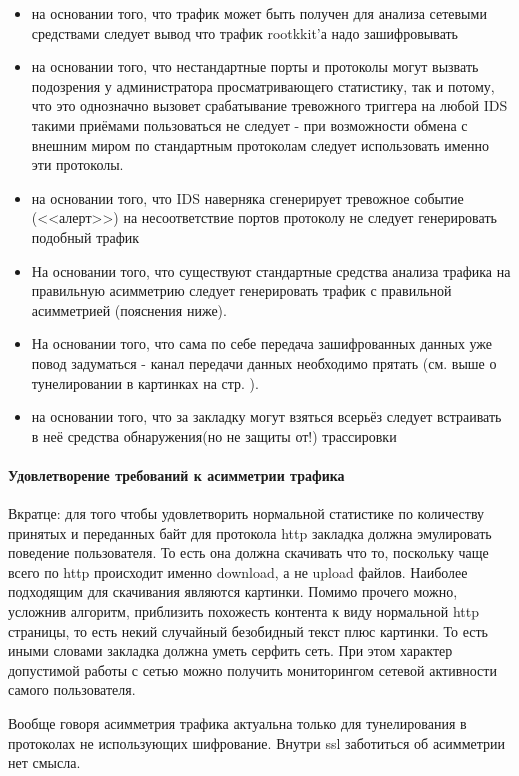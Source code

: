 \begin{itemize}
\item{на основании того, что трафик может быть получен для анализа сетевыми средствами следует вывод что трафик rootkkit'а надо зашифровывать}
\item{на основании того, что нестандартные порты и протоколы могут вызвать подозрения у администратора просматривающего статистику, так и потому, что это однозначно вызовет срабатывание тревожного триггера на любой IDS такими приёмами пользоваться не следует - при возможности обмена с внешним миром по стандартным протоколам следует использовать именно эти протоколы.}
\item{на основании того, что IDS наверняка сгенерирует тревожное событие (<<алерт>>) на несоответствие портов протоколу не следует генерировать подобный трафик}
\item{На основании того, что существуют стандартные средства анализа трафика на правильную асимметрию следует генерировать трафик с правильной асимметрией (пояснения ниже).}
\item{На основании того, что сама по себе передача зашифрованных данных уже повод задуматься - канал передачи данных необходимо прятать (см. выше о тунелировании в картинках на  стр. \pageref{hidden_tunnel}).}
\item{на основании того, что за закладку могут взяться всерьёз следует встраивать в неё средства обнаружения(но не защиты от!) трассировки}
\end{itemize}

\paragraph{Удовлетворение требований к асимметрии трафика\\}
Вкратце: для того чтобы удовлетворить нормальной статистике по
количеству принятых и переданных  байт для протокола http закладка
должна эмулировать поведение пользователя. То есть она должна скачивать
что то, поскольку чаще всего по http происходит именно download, а не
upload файлов. Наиболее подходящим для скачивания являются картинки.
Помимо прочего можно, усложнив алгоритм, приблизить похожесть контента к
виду нормальной http страницы, то есть некий случайный безобидный текст
плюс картинки. То есть иными словами закладка должна уметь серфить сеть.
При этом характер допустимой работы с сетью можно получить мониторингом
сетевой активности самого пользователя.

Вообще говоря асимметрия трафика актуальна только для тунелирования
в протоколах не использующих шифрование. Внутри ssl заботиться об асимметрии нет смысла.

